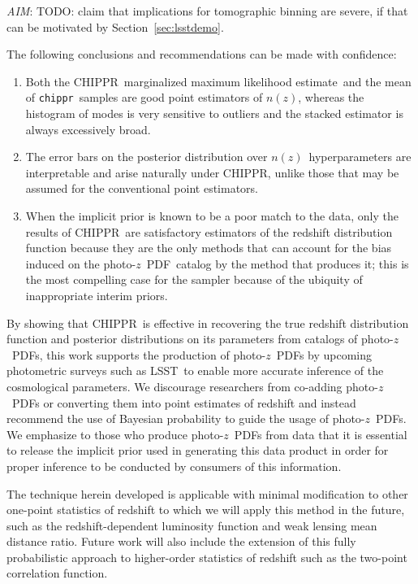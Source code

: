 \documentclass[iop]{emulateapj}
\newcommand{\todo}[3]{{\color{#2}\emph{#1}: #3}}
\newcommand{\aim}[1]{\todo{AIM}{red}{#1}}
\newcommand{\project}[1]{\textsc{#1}}
\newcommand{\lsst}{\project{LSST}}
\newcommand{\Chippr}{\project{CHIPPR}}%
\newcommand{\repo}[1]{\texttt{#1}}
\newcommand{\chippr}{\repo{chippr}}
\newcommand{\pz}{photo-$z$}
\newcommand{\pzpdf}{\pz\ PDF}%
\newcommand{\nz}{$n(z)$}
\newcommand{\mmle}{marginalized maximum likelihood estimate}%
\begin{document}
\aim{TODO: claim that implications for tomographic binning are severe, if that can be motivated by Section~\ref{sec:lsstdemo}.}

The following conclusions and recommendations can be made with confidence:

\begin{enumerate}
	\item Both the \Chippr\ \mmle\ and the mean of \chippr\ samples are good point estimators of \nz, whereas the histogram of modes is very sensitive to outliers and the stacked estimator is always excessively broad.
	\item The error bars on the posterior distribution over \nz\ hyperparameters are interpretable and arise naturally under \Chippr, unlike those that may be assumed for the conventional point estimators.
	\item When the implicit prior is known to be a poor match to the data, only the results of \Chippr\ are satisfactory estimators of the redshift distribution function because they are the only methods that can account for the bias induced on the \pzpdf\ catalog by the method that produces it; this is the most compelling case for the sampler because of the ubiquity of inappropriate interim priors.
\end{enumerate}

By showing that \Chippr\ is effective in recovering the true redshift distribution function and posterior distributions on its parameters from catalogs of \pzpdf s, this work supports the production of \pzpdf s by upcoming photometric surveys such as \lsst\ to enable more accurate inference of the cosmological parameters.  
We discourage researchers from co-adding \pzpdf s or converting them into point estimates of redshift and instead recommend the use of Bayesian probability to guide the usage of \pzpdf s.  
We emphasize to those who produce \pzpdf s from data that it is essential to release the implicit prior used in generating this data product in order for proper inference to be conducted by consumers of this information.

The technique herein developed is applicable with minimal modification to other one-point statistics of redshift to which we will apply this method in the future, such as the redshift-dependent luminosity function and weak lensing mean distance ratio.  
Future work will also include the extension of this fully probabilistic approach to higher-order statistics of redshift such as the two-point correlation function.
\end{document}
